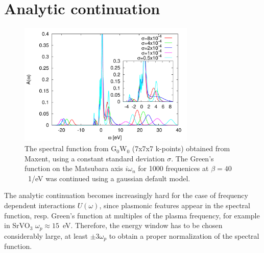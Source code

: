 \documentclass[12pt,a4paper]{scrartcl}
\numberwithin{equation}{section}
\begin{document}
\clearpage


\section{Analytic continuation}
\begin{figure}[t]
\begin{center}
\includegraphics[width=0.75\textwidth]{figs/GW_maxent_diffSigma.pdf} 
\end{center}
\caption{The spectral function from G$_0$W$_0$ (7x7x7 k-points) obtained from
Maxent, using a constant standard deviation $\sigma$. The Green's function
on the Matsubara axis $i\omega_n$ for 1000 frequenices at $\beta=40$\ 1/eV was continued
using a gaussian default model.}
\label{fig:gw_anacont_diff_sigma}
\end{figure}

The analytic continuation becomes increasingly hard for the case
of frequency dependent interactions $U(\omega)$,
since plasmonic features appear in the spectral function, resp.
Green's function at multiples of the plasma frequency,
for example in SrVO$_3$ $\omega_p\approx 15$~eV.
Therefore, the energy window has to be chosen considerably large, at least $\pm 3\omega_p$
to obtain a proper normalization of the spectral function.
\end{document}
